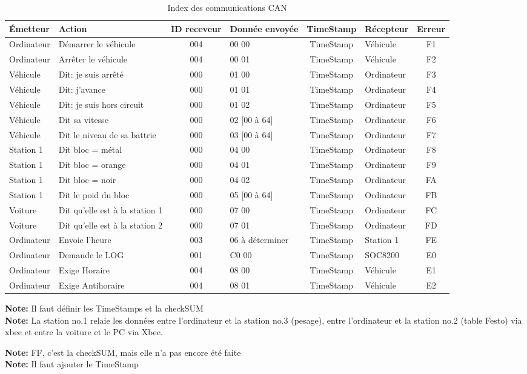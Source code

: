 \documentclass[10pt,a4paper,final]{article}
\begin{document}
\begin{spacing}{1.5}
\begin{table}[!ht]
\caption{Index des communications CAN}
\medskip
\centering
\begin{tabular}{|l|l|c|l|c|l|c|}
\hline 
\textbf{Émetteur} & \textbf{Action} & \textbf{ID receveur} & \textbf{Donnée envoyée} & \textbf{TimeStamp} & \textbf{Récepteur} & \textbf{Erreur}\\ 
\hline 
Ordinateur & Démarrer le véhicule & 004 & 00 00 & TimeStamp & Véhicule &  F1\\ 
\hline 
Ordinateur & Arrêter le véhicule & 004 & 00 01 & TimeStamp & Véhicule &  F2\\ 
\hline 
Véhicule & Dit: je suis arrêté & 000 & 01 00  & TimeStamp & Ordinateur &  F3\\
\hline 
Véhicule & Dit: j'avance & 000 & 01 01 & TimeStamp & Ordinateur  &  F4\\  
\hline 
Véhicule & Dit: je suis hors circuit & 000 & 01 02 & TimeStamp & Ordinateur &  F5\\ 
\hline 
Véhicule & Dit sa vitesse & 000 & 02 [00 à 64] & TimeStamp & Ordinateur &  F6\\ 
\hline 
Véhicule & Dit le niveau de sa battrie & 000 & 03 [00 à 64] & TimeStamp & Ordinateur &  F7\\ 
\hline 
Station 1 & Dit bloc = métal & 000 & 04 00 & TimeStamp & Ordinateur &  F8\\ 
\hline  
Station 1 & Dit bloc = orange & 000 & 04 01 & TimeStamp & Ordinateur &  F9\\
\hline 
Station 1 & Dit bloc = noir & 000 & 04 02 & TimeStamp & Ordinateur &  FA\\
\hline 
Station 1 & Dit le poid du bloc & 000 & 05 [00 à 64] & TimeStamp & Ordinateur &  FB\\ 
\hline 
Voiture & Dit qu'elle est à la station 1 & 000 & 07 00 & TimeStamp & Ordinateur &  FC\\ 
\hline 
Voiture & Dit qu'elle est à la station 2 & 000 & 07 01 & TimeStamp & Ordinateur &  FD\\
\hline 
Ordinateur & Envoie l'heure & 003 & 06 à déterminer & TimeStamp & Station 1 &  FE\\ 
\hline 
Ordinateur & Demande le LOG & 001 & C0 00 & TimeStamp & SOC8200 & E0\\ 
\hline
Ordinateur & Exige Horaire & 004 & 08 00 & TimeStamp & Véhicule & E1\\ 
\hline
Ordinateur & Exige Antihoraire & 004 & 08 01 & TimeStamp & Véhicule & E2\\ 
\hline
\end{tabular} 
\label{tab:testtab1}
\end{table}
\begin{flushleft}
\textbf{Note:} Il faut définir les TimeStamps et la checkSUM\\
\textbf{Note:} La station no.1 relaie les données entre l'ordinateur et la station no.3 (pesage), entre l'ordinateur et la station no.2 (table Festo) via xbee et entre la voiture et le PC via Xbee.
\end{flushleft}
\pagebreak
\textbf{Note:} FF, c'est la checkSUM, mais elle n'a pas encore été faite \\
\textbf{Note:} Il faut ajouter le TimeStamp 
\end{spacing}
\end{document}
